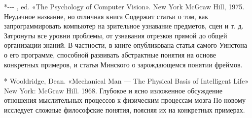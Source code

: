 *-\/-\/- , ed. «The Psychology of Computer Vision». New York McGraw Hill, 1975. Неудачное название, но отличная книга Содержит статьи о том, как запрограммировать компьютер на зрительное узнавание предметов, сцен и т. д. Затронуты все уровни проблемы, от узнавания отрезков прямой до общей организации знаний. В частности, в книге опубликована статья самого Уинстона о его программе, способной развивать абстрактные понятия на основе конкретных примеров, и статья Минского о зарождающемся понятии фреймов.

* Wooldridge, Dean. «Mechanical Man --- The Physical Basis of Intelligent Life» New York: McGraw Hill. 1968. Глубокое и ясно изложенное обсуждение отношения мыслительных процессов к физическим процессам мозга По новому исследует сложные философские понятия, поясняя их на конкретных примерах.
